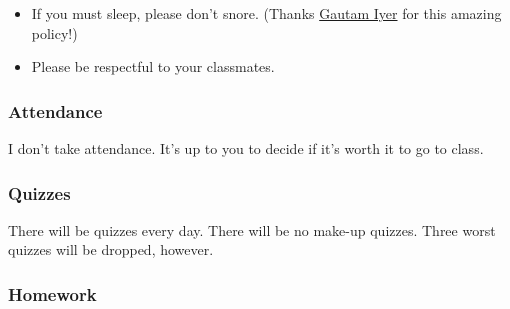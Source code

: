 \documentclass[
]{article}
\providecommand{\tightlist}{%
  \setlength{\itemsep}{0pt}\setlength{\parskip}{0pt}}
\begin{document}
\begin{itemize}
\tightlist
\item
  If you must sleep, please don't snore. (Thanks \href{https://www.math.cmu.edu/~gautam/}{Gautam Iyer} for this amazing policy!)
\item
  Please be respectful to your classmates.
\end{itemize}

\hypertarget{attendance}{%
\subsubsection*{Attendance}\label{attendance}}

I don't take attendance. It's up to you to decide if it's worth it to go to
class.

\hypertarget{quizzes}{%
\subsubsection*{Quizzes}\label{quizzes}}

There will be quizzes every day.
There will be no make-up quizzes.
Three worst quizzes will be dropped, however.

\hypertarget{homework}{%
\subsubsection*{Homework}\label{homework}}
\end{document}
